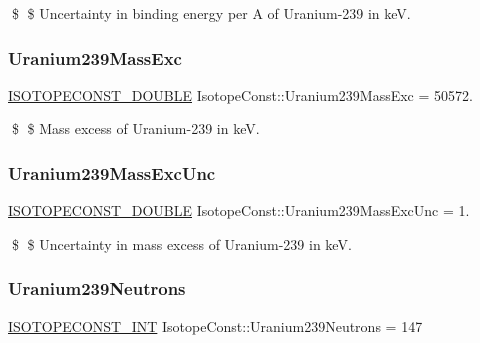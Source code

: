 \$ \$ Uncertainty in binding energy per A of Uranium-\/239 in keV. \mbox{\label{group___isotope_const-_uranium-_u239_ga7ee8fc47f92cbef072d460e3c5b39d10}} 
\subsubsection{\texorpdfstring{Uranium239\+Mass\+Exc}{Uranium239MassExc}}
{\footnotesize\ttfamily \mbox{\hyperlink{group___isotope_const-_macros_ga8f45a7272ce02c0b4c65c44636ed719a}{I\+S\+O\+T\+O\+P\+E\+C\+O\+N\+S\+T\+\_\+\+D\+O\+U\+B\+LE}} Isotope\+Const\+::\+Uranium239\+Mass\+Exc = 50572.}

\$ \$ Mass excess of Uranium-\/239 in keV. \mbox{\label{group___isotope_const-_uranium-_u239_ga06365669b8343a043cba26bfb385060c}} 
\subsubsection{\texorpdfstring{Uranium239\+Mass\+Exc\+Unc}{Uranium239MassExcUnc}}
{\footnotesize\ttfamily \mbox{\hyperlink{group___isotope_const-_macros_ga8f45a7272ce02c0b4c65c44636ed719a}{I\+S\+O\+T\+O\+P\+E\+C\+O\+N\+S\+T\+\_\+\+D\+O\+U\+B\+LE}} Isotope\+Const\+::\+Uranium239\+Mass\+Exc\+Unc = 1.}

\$ \$ Uncertainty in mass excess of Uranium-\/239 in keV. \mbox{\label{group___isotope_const-_uranium-_u239_ga77c3ea6fc7a83e2078c499b6719a6969}} 
\subsubsection{\texorpdfstring{Uranium239\+Neutrons}{Uranium239Neutrons}}
{\footnotesize\ttfamily \mbox{\hyperlink{group___isotope_const-_macros_ga5f18360b3e99483a35c32d789e62621c}{I\+S\+O\+T\+O\+P\+E\+C\+O\+N\+S\+T\+\_\+\+I\+NT}} Isotope\+Const\+::\+Uranium239\+Neutrons = 147}

